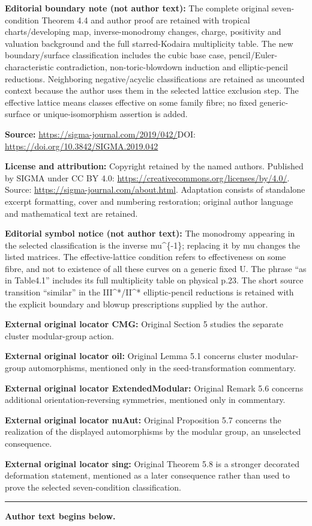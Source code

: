 \documentclass[11pt]{article}
\numberwithin{equation}{section}
\numberwithin{figure}{section}
\numberwithin{table}{section}
\theoremstyle{definition}
\begin{document}
\noindent\textbf{Editorial boundary note (not author text):} The complete original seven-condition Theorem 4.4 and author proof are retained with tropical charts/developing map, inverse-monodromy changes, charge, positivity and valuation background and the full starred-Kodaira multiplicity table. The new boundary/surface classification includes the cubic base case, pencil/Euler-characteristic contradiction, non-toric-blowdown induction and elliptic-pencil reductions. Neighboring negative/acyclic classifications are retained as uncounted context because the author uses them in the selected lattice exclusion step. The effective lattice means classes effective on some family fibre; no fixed generic-surface or unique-isomorphism assertion is added.\par
\noindent\textbf{Source:} \url{https://sigma-journal.com/2019/042/}\quad DOI: \url{https://doi.org/10.3842/SIGMA.2019.042}\par
\noindent\textbf{License and attribution:} Copyright retained by the named authors. Published by SIGMA under CC BY 4.0: \url{https://creativecommons.org/licenses/by/4.0/}. Source: \url{https://sigma-journal.com/about.html}. Adaptation consists of standalone excerpt formatting, cover and numbering restoration; original author language and mathematical text are retained.\par
\noindent\textbf{Editorial symbol notice (not author text):} The monodromy appearing in the selected classification is the inverse mu\textasciicircum{}\{-1\}; replacing it by mu changes the listed matrices. The effective-lattice condition refers to effectiveness on some fibre, and not to existence of all these curves on a generic fixed U. The phrase “as in Table4.1” includes its full multiplicity table on physical p.23. The short source transition “similar” in the III\textasciicircum{}*/II\textasciicircum{}* elliptic-pencil reductions is retained with the explicit boundary and blowup prescriptions supplied by the author.\par
\noindent\textbf{External original locator CMG:} Original Section 5 studies the separate cluster modular-group action.\par
\noindent\textbf{External original locator oil:} Original Lemma 5.1 concerns cluster modular-group automorphisms, mentioned only in the seed-transformation commentary.\par
\noindent\textbf{External original locator ExtendedModular:} Original Remark 5.6 concerns additional orientation-reversing symmetries, mentioned only in commentary.\par
\noindent\textbf{External original locator nuAut:} Original Proposition 5.7 concerns the realization of the displayed automorphisms by the modular group, an unselected consequence.\par
\noindent\textbf{External original locator sing:} Original Theorem 5.8 is a stronger decorated deformation statement, mentioned as a later consequence rather than used to prove the selected seven-condition classification.\par
\medskip\hrule\medskip\noindent\textbf{Author text begins below.}\par
\setcounter{section}{0}
\setcounter{subsection}{0}
\setcounter{subsubsection}{0}
\setcounter{thm}{0}
\setcounter{equation}{0}
\end{document}
